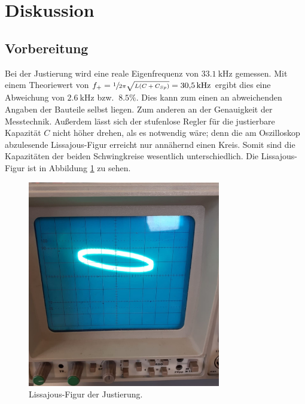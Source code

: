 \section{Diskussion}
\label{sec:Diskussion}

\subsection{Vorbereitung}
Bei der Justierung wird eine reale Eigenfrequenz von $\SI{33.1}{\kilo\hertz}$ gemessen. Mit einem Theoriewert von $f_+ = \sfrac{1}{2\pi\sqrt{L(C+C_{Sp})}} = \SI{30.5}{\kilo\hertz}$ ergibt dies eine
Abweichung von $\SI{2.6}{\kilo\hertz}$ bzw. $~8.5\%$.
Dies kann zum einen an abweichenden Angaben der Bauteile selbst liegen. Zum anderen an der Genauigkeit der Messtechnik. Außerdem lässt sich der stufenlose Regler für die justierbare Kapazität $C$
nicht höher drehen, als es notwendig wäre; denn die am Oszilloskop abzulesende Lissajous-Figur erreicht nur annähernd einen Kreis. Somit sind die Kapazitäten der beiden 
Schwingkreise wesentlich unterschiedlich. Die Lissajous-Figur ist in Abbildung \ref{fig:Lissajous} zu sehen.

\begin{figure}
    \centering
    \includegraphics[width=0.75\textwidth]{plots/Lissajous_90Grad.jpeg}
    \caption{Lissajous-Figur der Justierung.}
    \label{fig:Lissajous}
\end{figure}

